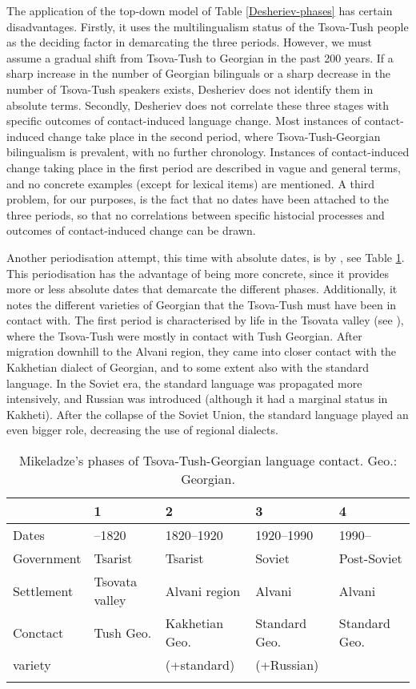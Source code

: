 The application of the top-down model of Table \ref{Desheriev-phases} has certain disadvantages. Firstly, it uses the multilingualism status of the Tsova-Tush people as the deciding factor in demarcating the three periods. However, we must assume a gradual shift from Tsova-Tush to Georgian in the past 200 years. If a sharp increase in the number of Georgian bilinguals or a sharp decrease in the number of Tsova-Tush speakers exists, Desheriev does not identify them in absolute terms. Secondly, Desheriev does not correlate these three stages with specific outcomes of contact-induced language change. Most instances of contact-induced change take place in the second period, where Tsova-Tush-Georgian bilingualism is prevalent, with no further chronology. Instances of contact-induced change taking place in the first period are described in vague and general terms, and no concrete examples (except for lexical items) are mentioned. A third problem, for our purposes, is the fact that no dates have been attached to the three periods, so that no correlations between specific histocial processes and outcomes of contact-induced change can be drawn.


Another periodisation attempt, this time with absolute dates, is by \textcite[14--15]{mikeladze08interf}, see Table \ref{mikeladze-phases}. 
This periodisation has the advantage of being more concrete, since it provides more or less absolute dates that demarcate the different phases. Additionally, it notes the different varieties of Georgian that the Tsova-Tush must have been in contact with. The first period is characterised by life in the Tsovata valley (see ), where the Tsova-Tush were mostly in contact with Tush Georgian. After migration downhill to the Alvani region, they came into closer contact with the Kakhetian dialect of Georgian, and to some extent also with the standard language. In the Soviet era, the standard language was propagated more intensively, and Russian was introduced (although it had a marginal status in Kakheti). After the collapse of the Soviet Union, the standard language played an even bigger role, decreasing the use of regional dialects.

\begin{table}
	\small
	\begin{tabular}{lllll}
    \lsptoprule
		& 1 & 2 & 3 & 4 \\
		\midrule
		Dates & --1820 & 1820--1920 & 1920--1990 & 1990-- \\
		Government & Tsarist & Tsarist & Soviet & Post-Soviet \\
		Settlement & Tsovata valley & Alvani region & Alvani & Alvani \\
		Conctact      & Tush    Geo. & Kakhetian Geo. & Standard Geo. & Standard Geo. \\
		\quad variety &              & (+standard)    & (+Russian) &  \\
		\lspbottomrule
	\end{tabular}
	\caption{Mikeladze's phases of Tsova-Tush-Georgian language contact. Geo.: Georgian.}
	\label{mikeladze-phases}
\end{table}




